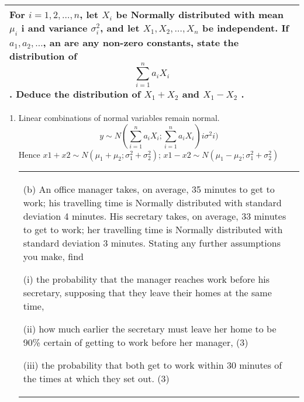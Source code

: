 \documentclass[a4paper,12pt]{article}
\begin{document}
\begin{table}[ht!]
     \centering
     \begin{tabular}{|p{15cm}|}
     \hline        
For $i = 1, 2, \ldots, n$, let $X_i$ be Normally distributed with mean $\mu_i$ i and variance $\sigma^2_i$, and let $X_1, X_2, \ldots, X_n$ be independent.  If $a_1, a_2, \ldots$, an are any 
non-zero constants, state the distribution of 
\[  \sum^{n}_{i=1} a_iX_i\] .  Deduce the 
distribution of $X_1 + X_2$ and $X_1 - X_2$ . 
 \\ \hline
      \end{tabular}
    \end{table}
    

    

\begin{enumerate}
    \item 
Linear combinations of normal variables remain normal.
\[
y \sim N( \sum^{n}_{i=1} a_iX_i;  \sum^{n}_{i=1} a_iX_i)
i \sigma^2
i )\]
Hence $x1 + x2 \sim N(\mu_1 + \mu_2; \sigma^2_1 + \sigma^2_2)$; $x1 - x2 \sim N(\mu_1 - \mu_2; \sigma^2_1 + \sigma^2_2)$
\newpage
  \begin{table}[ht!]
     \centering
     \begin{tabular}{|p{15cm}|}
     \hline  
 
(b) An office manager takes, on average, 35 minutes to get to work;  his travelling time is Normally distributed with standard deviation 4 minutes.  His secretary takes, on average, 33 minutes to get to work;  her travelling time is Normally distributed with standard deviation 3 minutes.  Stating any further assumptions you make, find 
 
(i) the probability that the manager reaches work before his secretary, supposing that they leave their homes at the same time, 
 
(ii) how much earlier the secretary must leave her home to be 90\% certain of getting to work before her manager, (3) 
 
(iii) the probability that both get to work within 30 minutes of the times at which they set out. (3) 
 

\end{tabular}
\end{table}
\end{enumerate}
\end{document}
